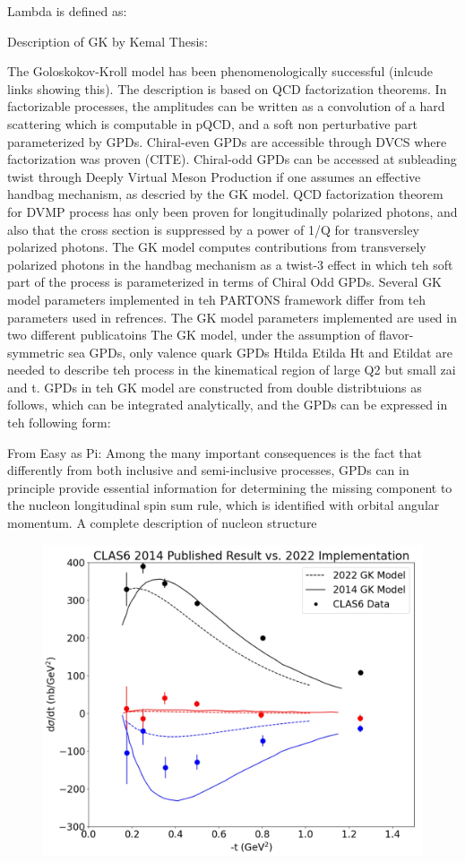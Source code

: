 Lambda is defined as: %

Description of GK by Kemal Thesis:

The Goloskokov-Kroll model has been phenomenologically successful (inlcude links showing this).  The description is based on QCD factorization theorems. In factorizable processes, the amplitudes can be written as a convolution of a hard scattering which is computable in pQCD, and a soft non perturbative part parameterized by GPDs. Chiral-even GPDs are accessible through DVCS where factorization was proven (CITE). Chiral-odd GPDs can be accessed at subleading twist through Deeply Virtual Meson Production if one assumes an effective handbag mechanism, as descried by the GK model. 
QCD factorization theorem for DVMP process has only been proven for longitudinally polarized photons, and also that the cross section is suppressed by a power of 1/Q for transversley polarized photons. 
The GK model computes contributions from transversely polarized photons in the handbag mechanism as a twist-3 effect in which teh soft part of the process is parameterized in terms of Chiral Odd GPDs.
Several GK model parameters implemented in teh PARTONS framework differ from teh parameters used in refrences. The GK model parameters implemented are used in two different publicatoins
The GK model, under the assumption of flavor-symmetric sea GPDs, only valence quark GPDs Htilda Etilda Ht and Etildat are needed to describe teh process in the kinematical region of large Q2 but small zai and t. GPDs in teh GK model are constructed from double distribtuions as follows, which can be integrated analytically, and the GPDs can be expressed in teh following form:


From Easy as Pi:
Among the many important consequences is the fact that differently from both inclusive and semi-inclusive processes, GPDs can in principle provide essential information
for determining the missing component to the nucleon longitudinal spin sum rule, which
is identified with orbital angular momentum. A complete description of nucleon structure


\begin{figure}[hbt]
	\centering
	\includegraphics[page=6,width=0.6\linewidth]{Chapters/Ch5-FurtherAnalysis/pics/2022_vs_2014_GK_model.jpg}
\end{figure}\label{fig:oldres2}

